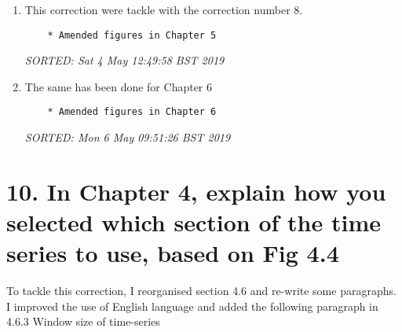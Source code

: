 \documentclass[12pt]{article}
\begin{document}
\begin{enumerate}

\item  This correction were tackle with the correction number 8.

	\begin{verbatim}
	* Amended figures in Chapter 5	
	\end{verbatim}
	\textit{
	SORTED:  Sat  4 May 12:49:58 BST 2019
	}
	\\

\item  The same has been done for Chapter 6

	\begin{verbatim}
	* Amended figures in Chapter 6
	\end{verbatim}
	\textit{
	SORTED:  Mon  6 May 09:51:26 BST 2019
	}
	\\




\end{enumerate}




\section*{10.
In Chapter 4, explain how you selected which 
section of the time series to use, based on Fig 4.4
}

	To tackle this correction, 
	I reorganised section 4.6 and re-write some paragraphs.
	I improved the use of English language and
	added the following paragraph 
	in 4.6.3 Window size of time-series 
 
\end{document}
